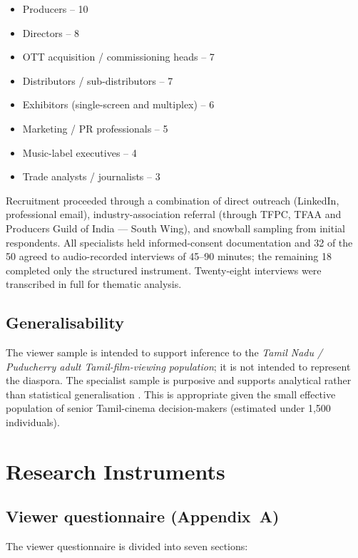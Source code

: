 \begin{itemize}[itemsep=2pt]
  \item Producers -- 10
  \item Directors -- 8
  \item OTT acquisition / commissioning heads -- 7
  \item Distributors / sub-distributors -- 7
  \item Exhibitors (single-screen and multiplex) -- 6
  \item Marketing / PR professionals -- 5
  \item Music-label executives -- 4
  \item Trade analysts / journalists -- 3
\end{itemize}

Recruitment proceeded through a combination of direct outreach
(LinkedIn, professional email), industry-association referral
(through TFPC, TFAA and Producers Guild of India --- South Wing),
and snowball sampling from initial respondents.  All specialists
held informed-consent documentation and 32 of the 50 agreed to
audio-recorded interviews of 45--90 minutes; the remaining 18
completed only the structured instrument.  Twenty-eight interviews
were transcribed in full for thematic analysis.

\subsection{Generalisability}

The viewer sample is intended to support inference to the
\emph{Tamil Nadu / Puducherry adult Tamil-film-viewing population};
it is not intended to represent the diaspora.  The specialist
sample is purposive and supports analytical rather than statistical
generalisation \citep{yin2018}.  This is appropriate given the
small effective population of senior Tamil-cinema decision-makers
(estimated under 1{,}500 individuals).

\section{Research Instruments}
\label{sec:instruments}

\subsection{Viewer questionnaire (Appendix~A)}

The viewer questionnaire is divided into seven sections:

